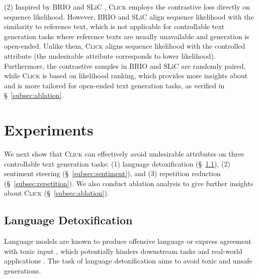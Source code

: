 (2) Inspired by BRIO \cite{brio} and SLiC \cite{slic}, \textsc{Click} employs the contrastive loss directly on sequence likelihood. However, BRIO and SLiC align sequence likelihood with the similarity to reference text, which is not applicable for controllable text generation tasks where reference texts are usually unavailable and generation is open-ended. Unlike them, \textsc{Click} aligns sequence likelihood with the controlled attribute (the undesirable attribute corresponds to lower likelihood). Furthermore, the contrastive samples in BRIO and SLiC are randomly paired, while \textsc{Click} is based on likelihood ranking, which provides more insights about and is more tailored for open-ended text generation tasks, as verified in \S~\ref{subsec:ablation}.

\section{Experiments}
\label{sec:experiment}

We next show that \textsc{Click} can effectively avoid undesirable attributes on three controllable text generation tasks: (1) language detoxification (\S~\ref{subsec:toxicity}), (2) sentiment steering (\S~\ref{subsec:sentiment}), and (3) repetition reduction (\S~\ref{subsec:repetition}).
We also conduct ablation analysis to give further insights about \textsc{Click} (\S~\ref{subsec:ablation}).

\subsection{Language Detoxification}
\label{subsec:toxicity}

Language models are known to produce offensive language \cite{realtoxicityprompts} or express agreement with toxic input \cite{bad, diasafety}, which potentially hinders downstream tasks and real-world applications \cite{red-teaming, augesc}. The task of language detoxification aims to avoid toxic and unsafe generations.

